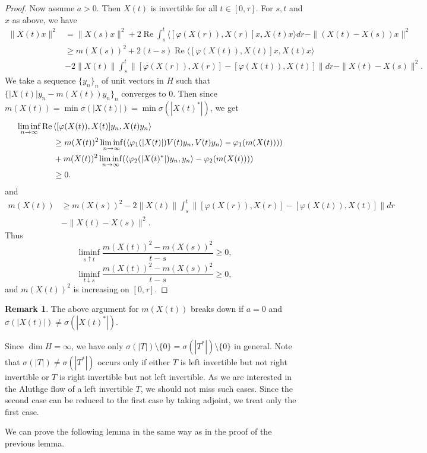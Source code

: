 \documentclass[12pt]{article}
\theoremstyle{definition}
\newtheorem{remark}[theorem]{Remark}
\numberwithin{equation}{section}
\renewcommand{\Re}{\operatorname{Re}}
\newcommand{\inpr}[2]{\langle{#1,#2}\rangle}
\begin{document}
\begin{proof}
Now assume $a>0$. 
Then $X(t)$ is invertible for all $t\in [0,\tau]$. 
For $s,t$ and $x$ as above, we have 
 \begin{align*}
 	\|X(t)x\|^2	 &= \|X(s)x\|^2+2\Re\int_s^t\inpr{[\varphi(X(r)),X(r)]x}{X(t)x}dr-\|(X(t)-X(s))x\|^2 \\
 	&\geq m(X(s))^2+2(t-s)\Re \inpr{[\varphi(X(t)),X(t)]x}{X(t)x}\\
 	&-2\|X(t)\| \int_s^t\|[\varphi(X(r)),X(r)]-[\varphi(X(t)),X(t)]\|dr-\|X(t)-X(s)\|^2.
 \end{align*}
We take a sequence $\{y_n\}_n$ of unit vectors in $H$ such that $\{|X(t)|y_n-m(X(t))y_n\}_n$ converges to 0. 
Then since $m(X(t))=\min\sigma(|X(t)|)=\min\sigma(|X(t)^*|)$, we get 
\begin{align*}
	\liminf_{n\to\infty}\Re\lefteqn{\inpr{[\varphi(X(t)),X(t)]y_n}{X(t)y_n}}\\
	&\geq m(X(t))^2\liminf_{n\to\infty}(\inpr{\varphi_1(|X(t)|)V(t)y_n}{V(t)y_n}-\varphi_1(m(X(t))))\\
	&+m(X(t))^2\liminf_{n\to\infty}(\inpr{\varphi_2(|X(t)^*|)y_n}{y_n}-\varphi_2(m(X(t))))\\
	&\geq 0.
\end{align*}
and  
\begin{align*}
m(X(t))&\geq m(X(s))^2-2\|X(t)\| \int_s^t\|[\varphi(X(r)),X(r)]-[\varphi(X(t)),X(t)]\|dr\\
&-\|X(t)-X(s)\|^2.
\end{align*}
Thus 
\[\liminf_{s\uparrow t}\frac{m(X(t))^2-m(X(s))^2}{t-s}\geq 0,\]
\[\liminf_{t\downarrow s}\frac{m(X(t))^2-m(X(s))^2}{t-s}\geq 0,\]
and $m(X(t))^2$ is increasing on $[0,\tau]$. 
\end{proof}

\begin{remark} The above argument for $m(X(t))$ breaks down if $a=0$ and $\sigma(|X(t)|)\neq \sigma(|X(t)^*|)$.   
\end{remark}

Since $\dim H=\infty$, we have only $\sigma(|T|)\setminus \{0\}=\sigma(|T^*|)\setminus \{0\}$ in general. 
Note that $\sigma(|T|)\neq \sigma(|T^*|)$ occurs only if either $T$ is left invertible but not right invertible or $T$ is right invertible but not left invertible. 
As we are interested in the Aluthge flow of a left invertible $T$, 
we should not miss such cases. 
Since the second case can be reduced to the first case by taking adjoint, 
we treat only the first case. 

We can prove the following lemma in the same way as in the proof of the previous lemma. 
\end{document}
